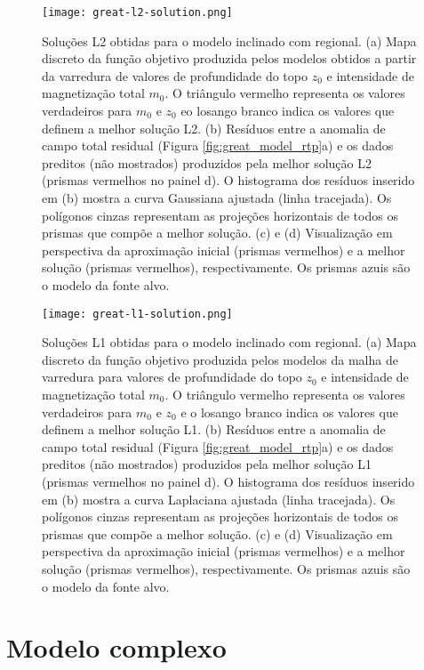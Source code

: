 \begin{figure}[!htb]
	\centering
	\texttt{[image: great-l2-solution.png]}
	\caption{Soluções L2 obtidas para o modelo inclinado com regional. 
		(a) Mapa discreto da função objetivo produzida pelos modelos obtidos a partir da varredura de valores de profundidade do topo $z_{0}$ e intensidade de magnetização total $m_{0}$. 
		O triângulo vermelho representa os valores verdadeiros para $m_{0}$ e $z_{0}$ eo losango branco indica os valores que definem a melhor solução L2.
		(b) Resíduos entre a anomalia de campo total residual (Figura \ref{fig:great_model_rtp}a) 
		e os dados preditos (não mostrados) produzidos pela melhor solução L2 (prismas vermelhos no painel d). 
		O histograma dos resíduos inserido em (b) mostra a curva Gaussiana ajustada (linha tracejada).
		Os polígonos cinzas representam as projeções horizontais de todos os prismas que compõe a melhor solução. 
		(c) e (d) Visualização em perspectiva da aproximação inicial (prismas vermelhos) e 
		a melhor solução (prismas vermelhos), respectivamente. Os prismas azuis são o modelo da fonte alvo. 
	}
	\label{fig:great_l2_result}
\end{figure}
\pagebreak
\begin{figure}[!htb]
	\centering
	\texttt{[image: great-l1-solution.png]}
	\caption{Soluções L1 obtidas para o modelo inclinado com regional. 
		(a) Mapa discreto da função objetivo produzida pelos modelos da malha de varredura para valores de profundidade do topo $z_{0}$ e intensidade de magnetização total $m_{0}$. 
		O triângulo vermelho representa os valores verdadeiros para $m_{0}$ e $z_{0}$ e o losango branco indica os valores que definem a melhor solução L1.
		(b) Resíduos entre a anomalia de campo total residual (Figura \ref{fig:great_model_rtp}a) 
		e os dados preditos (não mostrados) produzidos pela melhor solução L1 (prismas vermelhos no painel d). 
		O histograma dos resíduos inserido em (b) mostra a curva Laplaciana ajustada (linha tracejada).
		Os polígonos cinzas representam as projeções horizontais de todos os prismas que compõe a melhor solução. 
		(c) e (d) Visualização em perspectiva da aproximação inicial (prismas vermelhos) e 
		a melhor solução (prismas vermelhos), respectivamente. Os prismas azuis são o modelo da fonte alvo. 
	}
	\label{fig:great_l1_result}
\end{figure}
\pagebreak


\section{Modelo complexo}
\label{sec:target_source_without_interference}

